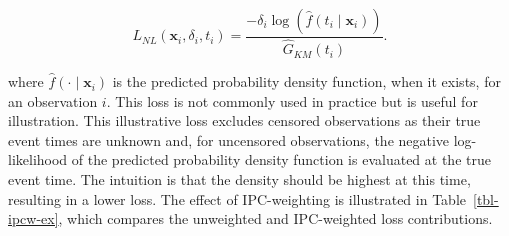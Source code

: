 \documentclass[
  letterpaper,
  krantz2]{style/krantz}
\begin{document}
\[
L_{NL}(\mathbf{x}_i, \delta_i, t_i) = \frac{-\delta_i \log(\hat{f}(t_i \mid \mathbf{x}_i))}{\hat{G}_{KM}(t_i)}.
\]

where \(\hat{f}(\cdot \mid \mathbf{x}_i)\) is the predicted probability
density function, when it exists, for an observation \(i\). This loss is
not commonly used in practice but is useful for illustration. This
illustrative loss excludes censored observations as their true event
times are unknown and, for uncensored observations, the negative
log-likelihood of the predicted probability density function is
evaluated at the true event time. The intuition is that the density
should be highest at this time, resulting in a lower loss. The effect of
IPC-weighting is illustrated in Table~\ref{tbl-ipcw-ex}, which compares
the unweighted and IPC-weighted loss contributions.
\end{document}
